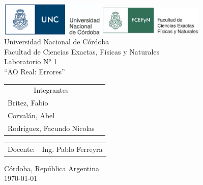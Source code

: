 \begin{titlepage}

\begin{center}
    \includegraphics[width=5cm]{img/unc_logo.png} \hspace{2cm}
    \includegraphics[width=5cm]{img/fcefyn_logo.jpg}
    \\[1cm]
    \vspace{5pt}
    \LARGE Universidad Nacional de Córdoba\\[0.6cm] 
    \large Facultad de Ciencias Exactas, Físicas y Naturales 
    \\[4cm] 
    \large Laboratorio N° 1
    \\[0.8cm]
    \large “AO Real: Errores”
    \\[0.2cm]
    \vspace{60pt}
    \begin{table}[!h]
    
    \centering
    \begin{tabular}{ll}
    \multicolumn{1}{c}{Integrantes} \\
    Britez, Fabio\\
    Corvalán, Abel \\
    Rodriguez, Facundo Nicolas 
    \end{tabular}
    \end{table}
    \vspace{20pt}
    \begin{table}[!h]
    \centering
    
    \begin{tabular}{ll}
    \multicolumn{1}{c}{Docente:} & Ing. Pablo Ferreyra
    \end{tabular}
    \end{table}
    \vfill
    Córdoba, República Argentina\\
    \today
\end{center}

\end{titlepage}